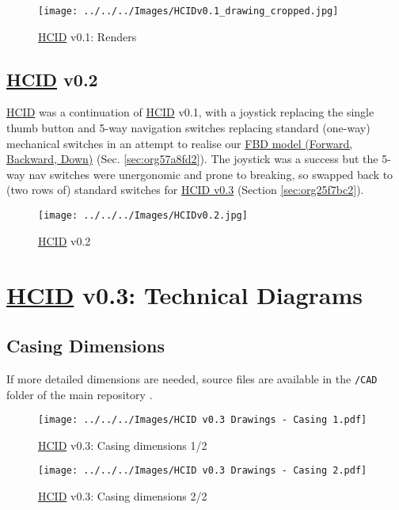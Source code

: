 \documentclass[logo,bsc,singlespacing,parskip]{infthesis}
\begin{document}
\begin{figure}[h]
\centering
\texttt{[image: ../../../Images/HCIDv0.1\_drawing\_cropped.jpg]}
\caption{\hyperref[org0c83164]{HCID} v0.1: Renders}
\end{figure}

\section{\hyperref[org0c83164]{HCID} v0.2}
\label{sec:org283f883}
\hyperref[org0c83164]{HCID} was a continuation of \hyperref[org0c83164]{HCID} v0.1, with a joystick replacing the single thumb button and 5-way navigation switches \autocite{5wayNavigationSwitch} replacing standard (one-way) mechanical switches in an attempt to realise our \hyperref[sec:org57a8fd2]{FBD model (Forward, Backward, Down)} (Sec. \ref{sec:org57a8fd2}).
The joystick was a success but the 5-way nav switches were unergonomic and prone to breaking, so swapped back to (two rows of) standard switches for \hyperref[sec:org25f7bc2]{HCID v0.3} (Section \ref{sec:org25f7bc2}).

\begin{figure}[h]
\centering
\texttt{[image: ../../../Images/HCIDv0.2.jpg]}
\caption{\hyperref[org0c83164]{HCID} v0.2}
\end{figure}

\chapter{\hyperref[org0c83164]{HCID} v0.3: Technical Diagrams}
\label{sec:orga0edbaf}
\section{Casing Dimensions}
\label{sec:org1632766}
If more detailed dimensions are needed, source files are available in the \texttt{/CAD} folder of the main repository \autocite{sharpNazzacodeHCIDMy}.

\begin{landscape}
\begin{figure}[htbp]
\centering
\texttt{[image: ../../../Images/HCID v0.3 Drawings - Casing 1.pdf]}
\caption{\hyperref[org0c83164]{HCID} v0.3: Casing dimensions 1/2}
\end{figure}
\end{landscape}

\begin{landscape}
\begin{figure}[htbp]
\centering
\texttt{[image: ../../../Images/HCID v0.3 Drawings - Casing 2.pdf]}
\caption{\hyperref[org0c83164]{HCID} v0.3: Casing dimensions 2/2}
\end{figure}
\end{landscape}
\restoregeometry
\end{document}
